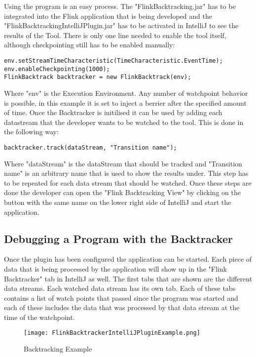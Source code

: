 Using the program is an easy process. The "FlinkBacktracking.jar" has to be integrated into the Flink application that is being developed and the "FlinkBacktrackingIntelliJPlugin.jar" has to be activated in IntelliJ to see the results of the Tool. There is only one line needed to enable the tool itself, although checkpointing still has to be enabled manually:

\begin{lstlisting}[caption={How to use the Backtracker}]
env.setStreamTimeCharacteristic(TimeCharacteristic.EventTime);
env.enableCheckpointing(1000);
FlinkBacktrack backtracker = new FlinkBacktrack(env);
\end{lstlisting}

Where "env" is the Execution Environment. Any number of watchpoint behavior is possible, in this example it is set to inject a berrier after the specified amount of time. Once the Backtracker is initilised it can be used by adding each datastream that the developer wants to be watched to the tool. This is done in the following way:

\begin{lstlisting}
backtracker.track(dataStream, "Transition name");
\end{lstlisting}

Where "dataStream" is the dataStream that should be tracked and "Transition name" is an arbitrary name that is used to show the results under. This step has to be repeated for each data stream that should be watched. Once these steps are done the developer can open the "Flink Backtracking View" by clicking on the button with the same name on the lower right side of IntelliJ and start the application.

\subsection{Debugging a Program with the Backtracker}
Once the plugin has been configured the application can be started. Each piece of data that is being processed by the application will show up in the "Flink Backtracker" tab in IntelliJ as well. The first tabs that are shown are the different data streams. Each watched data stream has its own tab. Each of these tabs contains a list of watch points that passed since the program was started and each of these includes the data that was processed by that data stream at the time of the watchpoint.

\begin{figure}[h!]
    \centering
      \texttt{[image: FlinkBacktrackerIntelliJPluginExample.png]}
      \caption{Backtracking Example}
      \label{flinkBacktrackingExample}
\end{figure}

